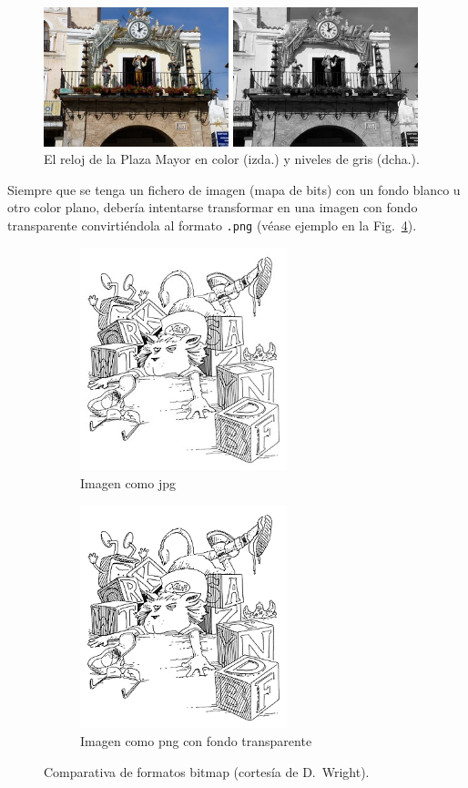 \documentclass[ 		%
	11pt,				%
	a4paper,			%
	twoside,			%
	openright,			%
	final       		%
]{book}
\begin{document}
\begin{figure}[hbt]
	\centering
		\includegraphics[width=0.97\textwidth]{2clockCR}
		\caption[Varias imágenes como una]{El reloj de la Plaza Mayor en color (izda.) y niveles de gris (dcha.).}
	\label{fig:2clock}
\end{figure}

Siempre que se tenga un fichero de imagen (mapa de bits) con un fondo blanco u otro color plano, debería intentarse transformar en una imagen con fondo transparente convirtiéndola al formato \texttt{.png} (véase ejemplo en la Fig.~\ref{fig:lion}).

\begin{figure}[hbt]
	\centering
  	\begin{subfigure}[b]{0.4\textwidth}
  		\centering
		\includegraphics[width=6cm]{lionL.jpg}
		\caption{Imagen como jpg}\label{fig:lionLjpg}
  	\end{subfigure}
  	\begin{subfigure}[b]{0.4\textwidth}
  		\centering
		\includegraphics[width=6cm]{lionL.png}
		\caption{Imagen como png con fondo transparente}\label{fig:lionpng}
  	\end{subfigure}
  	\caption[Comparación jpg y png con transparencia]{Comparativa de formatos bitmap (cortesía de D.~Wright).}
	\label{fig:lion}
\end{figure}
\end{document}
